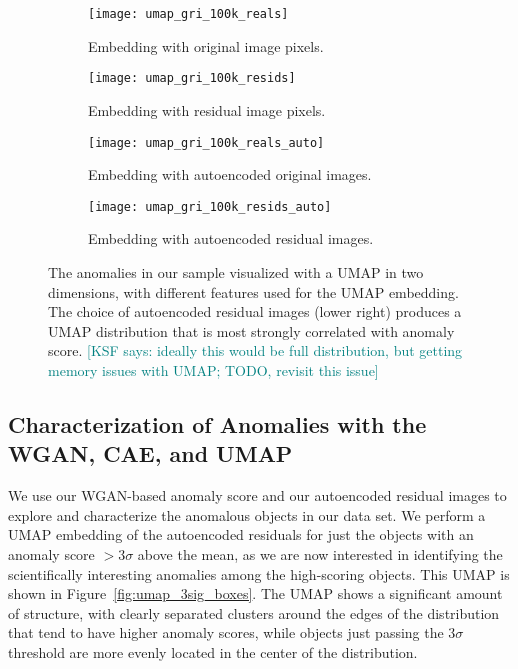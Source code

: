 \documentclass[fleqn,usenatbib,useAMS]{mnras}
\newcommand{\KSF}[1]{\textcolor{teal}{{[KSF says: #1]}}}
\begin{document}
\begin{figure*} 
\begin{subfigure}{.48\textwidth}
  \centering
  \texttt{[image: umap\_gri\_100k\_reals]}  
  \caption{Embedding with original image pixels.}
  \label{fig:umap_100k_reals}
\end{subfigure}
\begin{subfigure}{.48\textwidth}
  \centering
  \texttt{[image: umap\_gri\_100k\_resids]}  
  \caption{Embedding with residual image pixels.}
  \label{fig:umap_100k_resids}
\end{subfigure}

\begin{subfigure}{.48\textwidth}
  \centering
  \texttt{[image: umap\_gri\_100k\_reals\_auto]}  
  \caption{Embedding with autoencoded original images.}
  \label{fig:umap_100k_reals_auto}
\end{subfigure}
\begin{subfigure}{.48\textwidth}
  \centering
  \texttt{[image: umap\_gri\_100k\_resids\_auto]}  
  \caption{Embedding with autoencoded residual images.}
  \label{fig:umap_100k_resids_auto}
\end{subfigure}

\caption{The anomalies in our sample visualized with a UMAP in two dimensions, with different features used for the UMAP embedding. The choice of autoencoded residual images (lower right) produces a UMAP distribution that is most strongly correlated with anomaly score. \KSF{ideally this would be full distribution, but getting memory issues with UMAP; TODO, revisit this issue}}
\label{fig:umap_100k}
\end{figure*}

\subsection{Characterization of Anomalies with the WGAN, CAE, and UMAP}

We use our WGAN-based anomaly score and our autoencoded residual images to explore and characterize the anomalous objects in our data set.
We perform a UMAP embedding of the autoencoded residuals for just the objects with an anomaly score $>3\sigma$ above the mean, as we are now interested in identifying the scientifically interesting anomalies among the high-scoring objects.
This UMAP is shown in Figure~\ref{fig:umap_3sig_boxes}.
The UMAP shows a significant amount of structure, with clearly separated clusters around the edges of the distribution that tend to have higher anomaly scores, while objects just passing the $3\sigma$ threshold are more evenly located in the center of the distribution.
\end{document}
